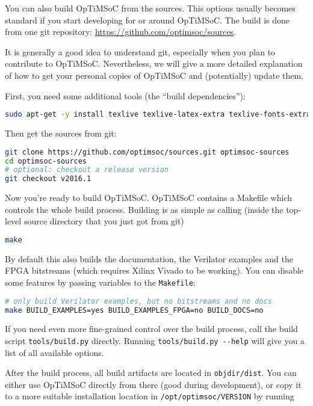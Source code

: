 You can also build OpTiMSoC from the sources. This options usually
becomes standard if you start developing for or around OpTiMSoC. The
build is done from one git repository:
\url{https://github.com/optimsoc/sources}.

It is generally a good idea to understand git, especially when you
plan to contribute to OpTiMSoC. Nevertheless, we will give a more
detailed explanation of how to get your personal copies of OpTiMSoC
and (potentially) update them.

First, you need some additional tools (the ``build dependencies''):
\begin{lstlisting}[language=sh]
sudo apt-get -y install texlive texlive-latex-extra texlive-fonts-extra
\end{lstlisting}

Then get the sources from git:
\begin{lstlisting}[language=sh]
git clone https://github.com/optimsoc/sources.git optimsoc-sources
cd optimsoc-sources
# optional: checkout a release version
git checkout v2016.1
\end{lstlisting}

Now you're ready to build OpTiMSoC.
OpTiMSoC contains a Makefile which controls the whole build process.
Building is as simple as calling (inside the top-level source directory that you just got from git)

\begin{lstlisting}[language=sh]
make
\end{lstlisting}

By default this also builds the documentation, the Verilator examples and the FPGA bitstreams (which requires Xilinx Vivado to be working).
You can disable some features by passing variables to the \verb|Makefile|:

\begin{lstlisting}[language=sh]
# only build Verilator examples, but no bitstreams and no docs
make BUILD_EXAMPLES=yes BUILD_EXAMPLES_FPGA=no BUILD_DOCS=no
\end{lstlisting}

If you need even more fine-grained control over the build process, call the build script \verb|tools/build.py| directly.
Running \verb|tools/build.py --help| will give you a list of all available options.

After the build process, all build artifacts are located in \verb|objdir/dist|.
You can either use OpTiMSoC directly from there (good during development), or copy it to a more suitable installation location in \verb|/opt/optimsoc/VERSION| by running

